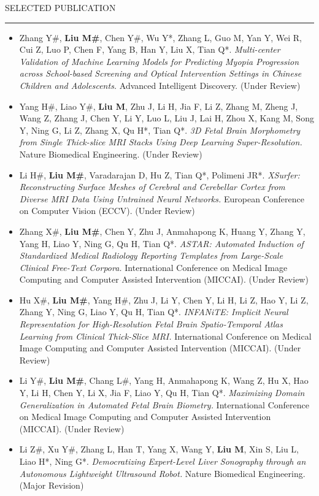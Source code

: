 \documentclass{resume} %
\renewenvironment{rSection}[1]{
\sectionskip
\textcolor{TsinghuaPurple}{\MakeUppercase{#1}}
\sectionlineskip
\hrule
\begin{list}{}{
\setlength{\leftmargin}{0em}
}
\item[]
}{
\end{list}
}
\begin{document}
\begin{rSection}{Selected Publication}
\begin{itemize}
    \item Zhang Y\#, \textbf{Liu M\#}, Chen Y\#, Wu Y*, Zhang L, Guo M, Yan Y, Wei R, Cui Z, Luo P, Chen F, Yang B, Han Y, Liu X, Tian Q*. \textit{Multi-center Validation of Machine Learning Models for Predicting Myopia Progression across School-based Screening and Optical Intervention Settings in Chinese Children and Adolescents.} Advanced Intelligent Discovery. (Under Review)
    
    \item Yang H\#, Liao Y\#, \textbf{Liu M}, Zhu J, Li H, Jia F, Li Z, Zhang M, Zheng J, Wang Z, Zhang J, Chen Y, Li Y, Luo L, Liu J, Lai H, Zhou X, Kang M, Song Y, Ning G, Li Z, Zhang X, Qu H*, Tian Q*. \textit{3D Fetal Brain Morphometry from Single Thick-slice MRI Stacks Using Deep Learning Super-Resolution.} Nature Biomedical Engineering. (Under Review)

    \item Li H\#, \textbf{Liu M\#}, Varadarajan D, Hu Z, Tian Q*, Polimeni JR*. \textit{XSurfer: Reconstructing Surface Meshes of Cerebral and Cerebellar Cortex from Diverse MRI Data Using Untrained Neural Networks.} European Conference on Computer Vision (ECCV). (Under Review)
    \item Zhang X\#, \textbf{Liu M\#}, Chen Y, Zhu J, Anmahapong K, Huang Y, Zhang Y, Yang H, Liao Y, Ning G, Qu H, Tian Q*. \textit{ASTAR: Automated Induction of Standardized Medical Radiology Reporting Templates from Large-Scale Clinical Free-Text Corpora.} International Conference on Medical Image Computing and Computer Assisted Intervention (MICCAI). (Under Review)
    \item Hu X\#, \textbf{Liu M\#}, Yang H\#, Zhu J, Li Y, Chen Y, Li H, Li Z, Hao Y, Li Z, Zhang Y, Ning G, Liao Y, Qu H, Tian Q*. \textit{INFANiTE: Implicit Neural Representation for High-Resolution Fetal Brain Spatio-Temporal Atlas Learning from Clinical Thick-Slice MRI.} International Conference on Medical Image Computing and Computer Assisted Intervention (MICCAI). (Under Review)
    \item Li Y\#, \textbf{Liu M\#}, Chang L\#, Yang H, Anmahapong K, Wang Z, Hu X, Hao Y, Li H, Chen Y, Li X, Jia F, Liao Y, Qu H, Tian Q*. \textit{Maximizing Domain Generalization in Automated Fetal Brain Biometry.} International Conference on Medical Image Computing and Computer Assisted Intervention (MICCAI). (Under Review)
    
    \item Li Z\#, Xu Y\#, Zhang L, Han T, Yang X, Wang Y, \textbf{Liu M}, Xin S, Liu L, Liao H*, Ning G*. \textit{Democratizing Expert-Level Liver Sonography through an Autonomous Lightweight Ultrasound Robot.} Nature Biomedical Engineering. (Major Revision)


\end{itemize}
\end{rSection}
\end{document}
